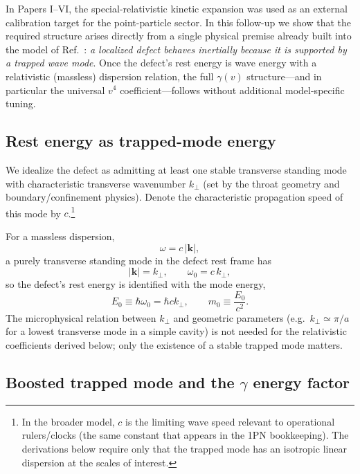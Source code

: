 \documentclass[11pt]{article}
\begin{document}
In Papers I--VI, the special-relativistic kinetic expansion was used as an external calibration target for the point-particle sector. In this follow-up we show that the required structure arises directly from a single physical premise already built into the model of Ref.~\cite{norris2026_4d_model}: \emph{a localized defect behaves inertially because it is supported by a trapped wave mode}. Once the defect's rest energy is wave energy with a relativistic (massless) dispersion relation, the full $\gamma(v)$ structure---and in particular the universal $v^4$ coefficient---follows without additional model-specific tuning.

\subsection{Rest energy as trapped-mode energy}

We idealize the defect as admitting at least one stable transverse standing mode with characteristic transverse wavenumber $k_\perp$ (set by the throat geometry and boundary/confinement physics). Denote the characteristic propagation speed of this mode by $c$.\footnote{In the broader model, $c$ is the limiting wave speed relevant to operational rulers/clocks (the same constant that appears in the 1PN bookkeeping). The derivations below require only that the trapped mode has an isotropic linear dispersion at the scales of interest.}

For a massless dispersion,
\begin{equation}
\omega = c\,|\mathbf k| ,
\end{equation}
a purely transverse standing mode in the defect rest frame has
\begin{equation}
|\mathbf k| = k_\perp, \qquad \omega_0 = c\,k_\perp,
\end{equation}
so the defect's rest energy is identified with the mode energy,
\begin{equation}
E_0 \equiv \hbar \omega_0 = \hbar c k_\perp,
\qquad
m_0 \equiv \frac{E_0}{c^2}.
\label{eq:E0_m0_def}
\end{equation}
The microphysical relation between $k_\perp$ and geometric parameters (e.g.\ $k_\perp\simeq \pi/a$ for a lowest transverse mode in a simple cavity) is not needed for the relativistic coefficients derived below; only the existence of a stable trapped mode matters.

\subsection{Boosted trapped mode and the \texorpdfstring{$\gamma$}{gamma} energy factor}
\end{document}
